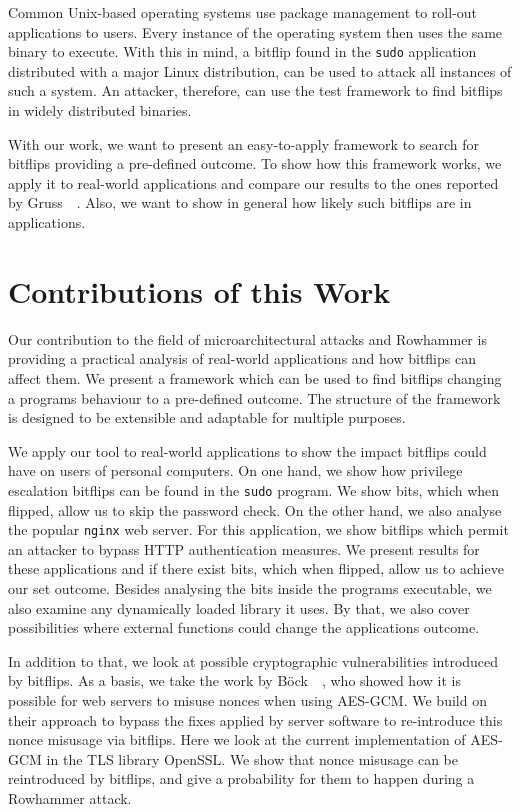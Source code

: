 Common Unix-based operating systems use package management to roll-out
applications to users. Every instance of the operating system then uses the same
binary to execute. With this in mind, a bitflip found in the \texttt{sudo}
application distributed with a major Linux distribution, can be used to attack
all instances of such a system. An attacker, therefore, can use the test
framework to find bitflips in widely distributed binaries.

With our work, we want to present an easy-to-apply framework to search for
bitflips providing a pre-defined outcome. To show how this framework works, we
apply it to real-world applications and compare our results to the ones reported
by Gruss~\etal~\cite{flipinthewall}. Also, we want to show in general how likely
such bitflips are in applications.

\section{Contributions of this Work}

Our contribution to the field of microarchitectural attacks and Rowhammer is
providing a practical analysis of real-world applications and how bitflips can
affect them. We present a framework which can be used to find bitflips changing
a program\textquotesingle s behaviour to a pre-defined outcome. The structure of
the framework is designed to be extensible and adaptable for multiple purposes.

We apply our tool to real-world applications to show the impact bitflips could
have on users of personal computers. On one hand, we show how privilege
escalation bitflips can be found in the \texttt{sudo} program. We show bits,
which when flipped, allow us to skip the password check. On the other hand, we
also analyse the popular \texttt{nginx} web server. For this application, we
show bitflips which permit an attacker to bypass HTTP authentication measures.
We present results for these applications and if there exist bits, which when
flipped, allow us to achieve our set outcome. Besides analysing the bits inside
the program\textquotesingle s executable, we also examine any dynamically loaded
library it uses. By that, we also cover possibilities where external functions
could change the application\textquotesingle s outcome.

In addition to that, we look at possible cryptographic vulnerabilities
introduced by bitflips. As a basis, we take the work by
Böck~\etal~\cite{gcmnonceattack}, who showed how it is possible for web servers
to misuse nonces when using AES-GCM. We build on their approach to bypass the
fixes applied by server software to re-introduce this nonce misusage via
bitflips. Here we look at the current implementation of AES-GCM in the TLS
library OpenSSL. We show that nonce misusage can be reintroduced by bitflips,
and give a probability for them to happen during a Rowhammer attack.

